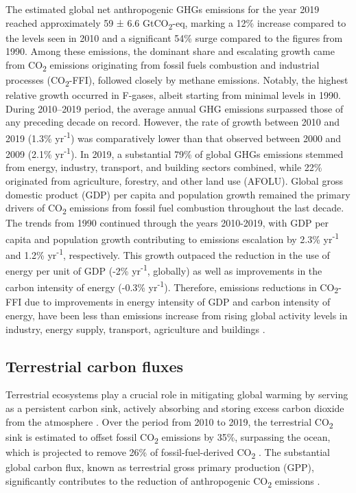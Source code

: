 The estimated global net anthropogenic GHGs emissions for the year 2019 reached approximately 59 ± 6.6 GtCO\textsubscript{2}-eq, marking a 12\% increase compared to the levels seen in 2010 and a significant 54\% surge compared to the figures from 1990. Among these emissions, the dominant share and escalating growth came from CO\textsubscript{2} emissions originating from fossil fuels combustion and industrial processes (CO\textsubscript{2}-FFI), followed closely by methane emissions. Notably, the highest relative growth occurred in F-gases, albeit starting from minimal levels in 1990. During 2010–2019 period, the average annual GHG emissions surpassed those of any preceding decade on record. However, the rate of growth between 2010 and 2019 (1.3\% yr\textsuperscript{-1}) was comparatively lower than that observed between 2000 and 2009 (2.1\% yr\textsuperscript{-1}). In 2019, a substantial 79\% of global GHGs emissions stemmed from energy, industry, transport, and building sectors combined, while 22\% originated from agriculture, forestry, and other land use (AFOLU). Global gross domestic product (GDP) per capita and population growth remained the primary drivers of CO\textsubscript{2} emissions from fossil fuel combustion throughout the last decade. The trends from 1990 continued through the years 2010-2019, with GDP per capita and population growth contributing to emissions escalation by 2.3\% yr\textsuperscript{-1} and 1.2\% yr\textsuperscript{-1}, respectively. This growth outpaced the reduction in the use of energy per unit of GDP (-2\% yr\textsuperscript{-1}, globally) as well as improvements in the carbon intensity of energy (-0.3\% yr\textsuperscript{-1}). Therefore, emissions reductions in CO\textsubscript{2}-FFI due to improvements in energy intensity of GDP and carbon intensity of energy, have been less than emissions increase from rising global activity levels in industry, energy supply, transport, agriculture and buildings \citep{portner2022ipcc}. \par

\subsection{Terrestrial carbon fluxes}

Terrestrial ecosystems play a crucial role in mitigating global warming by serving as a persistent carbon sink, actively absorbing and storing excess carbon dioxide from the atmosphere \citep{pan2011large}. Over the period from 2010 to 2019, the terrestrial CO\textsubscript{2} sink is estimated to offset fossil CO\textsubscript{2} emissions by 35\%, surpassing the ocean, which is projected to remove 26\% of fossil-fuel-derived CO\textsubscript{2} \citep{friedlingstein2020global, wang2022disentangling}. The substantial global carbon flux, known as terrestrial gross primary production (GPP), significantly contributes to the reduction of anthropogenic CO\textsubscript{2} emissions \citep{beer2010terrestrial}. \par

